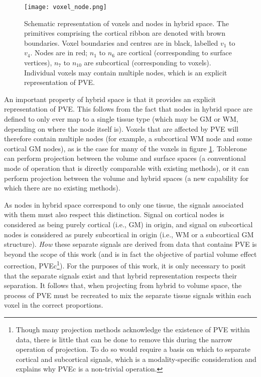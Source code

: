 \documentclass[review]{elsarticle}
\begin{document}
\begin{figure}
\centering
\texttt{[image: voxel\_node.png]}
\caption{Schematic representation of voxels and nodes in hybrid space. The primitives comprising the cortical ribbon are denoted with brown boundaries. Voxel boundaries and centres are in black, labelled $v_1$ to $v_4$. Nodes are in red; $n_1$ to $n_6$ are cortical (corresponding to surface vertices), $n_7$ to $n_{10}$ are subcortical (corresponding to voxels). Individual voxels may contain multiple nodes, which is an explicit representation of PVE.}
\label{voxel_node} 
\end{figure}

An important property of hybrid space is that it provides an explicit representation of PVE. This follows from the fact that nodes in hybrid space are defined to only ever map to a single tissue type (which may be GM or WM, depending on where the node itself is). Voxels that are affected by PVE will therefore contain multiple nodes (for example, a subcortical WM node and some cortical GM nodes), as is the case for many of the voxels in figure \ref{voxel_node}. Toblerone can perform projection between the volume and surface spaces (a conventional mode of operation that is directly comparable with existing methods), or it can perform projection between the volume and hybrid spaces (a new capability for which there are no existing methods). 

As nodes in hybrid space correspond to only one tissue, the signals associated with them must also respect this distinction. Signal on cortical nodes is considered as being purely cortical (i.e., GM) in origin, and signal on subcortical nodes is considered as purely subcortical in origin (i.e., WM or a subcortical GM structure). \textit{How} these separate signals are derived from data that contains PVE is beyond the scope of this work (and is in fact the objective of partial volume effect correction, PVEc\footnote{Though many projection methods acknowledge the existence of PVE within data, there is little that can be done to remove this during the narrow operation of projection. To do so would require a basis on which to separate cortical and subcortical signals, which is a modality-specific consideration and explains why PVEc is a non-trivial operation.}). For the purposes of this work, it is only necessary to posit that the separate signals exist and that hybrid representation respects their separation. It follows that, when projecting from hybrid to volume space, the process of PVE must be recreated to mix the separate tissue signals within each voxel in the correct proportions. 
\end{document}
